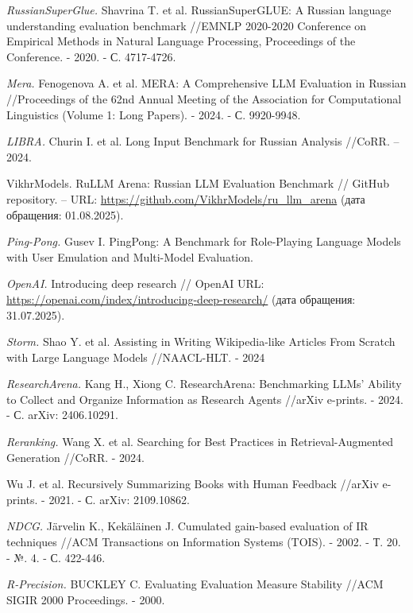 \documentclass{article}
\begin{document}
\begin{thebibliography}{99}

\textit{RussianSuperGlue.}
Shavrina T. et al. RussianSuperGLUE: A Russian language understanding evaluation benchmark //EMNLP 2020-2020 Conference on Empirical Methods in Natural Language Processing, Proceedings of the Conference. - 2020. - С. 4717-4726.

\textit{Mera.}
Fenogenova A. et al. MERA: A Comprehensive LLM Evaluation in Russian //Proceedings of the 62nd Annual Meeting of the Association for Computational Linguistics (Volume 1: Long Papers). - 2024. - С. 9920-9948.

\textit{LIBRA.}
Churin I. et al. Long Input Benchmark for Russian Analysis //CoRR. – 2024.

VikhrModels. RuLLM Arena: Russian LLM Evaluation Benchmark // GitHub repository. – URL: \url{https://github.com/VikhrModels/ru_llm_arena} (дата обращения: 01.08.2025).

\textit{Ping-Pong.}
Gusev I. PingPong: A Benchmark for Role-Playing Language Models with User Emulation and Multi-Model Evaluation.

\textit{OpenAI.}
Introducing deep research // OpenAI URL: \url{https://openai.com/index/introducing-deep-research/} (дата обращения: 31.07.2025).

\textit{Storm.}
Shao Y. et al. Assisting in Writing Wikipedia-like Articles From Scratch with Large Language Models //NAACL-HLT. - 2024

\textit{ResearchArena.}
Kang H., Xiong C. ResearchArena: Benchmarking LLMs' Ability to Collect and Organize Information as Research Agents //arXiv e-prints. - 2024. - С. arXiv: 2406.10291.

\textit{Reranking.}
Wang X. et al. Searching for Best Practices in Retrieval-Augmented Generation //CoRR. - 2024.

Wu J. et al. Recursively Summarizing Books with Human Feedback //arXiv e-prints. - 2021. - С. arXiv: 2109.10862.

\textit{NDCG.}
Järvelin K., Kekäläinen J. Cumulated gain-based evaluation of IR techniques //ACM Transactions on Information Systems (TOIS). - 2002. - Т. 20. - №. 4. - С. 422-446.

\textit{R-Precision.}
BUCKLEY C. Evaluating Evaluation Measure Stability //ACM SIGIR 2000 Proceedings. - 2000.


\end{thebibliography}
\end{document}
